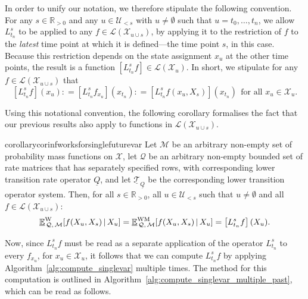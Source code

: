 \documentclass[10pt,a4paper]{paper}
\theoremstyle{definition}
\newcommand{\reals}{\mathbb{R}}
\newcommand{\realspos}{\reals_{>0}}
\newcommand{\states}{\mathcal{X}}
\newcommand{\gambles}{\mathcal{L}}
\newcommand{\rateset}{\mathcal{Q}}
\newcommand{\lrate}{\underline{Q}}
\newcommand{\coloneqq}{:\!=}
\begin{document}
In order to unify our notation, we therefore stipulate the following convention. For any $s\in\realspos$ and any $u\in\mathcal{U}_{<s}$ with $u\neq\emptyset$ such that $u=t_0,\ldots,t_n$, we allow $L_{t_n}^s$ to be applied to any $f\in\gambles(\states_{u\cup s})$, by applying it to the restriction of $f$ to the \emph{latest} time point at which it is defined---the time point $s$, in this case. Because this restriction depends on the state assignment $x_u$ at the other time points, the result is a function $[L_{t_n}^sf]\in\gambles(\states_u)$. In short, we stipulate for any $f\in\gambles(\states_{u\cup s})$ that
\begin{equation}\label{eq:applyLtolargerfunctions}
[L_{t_n}^sf](x_u) \coloneqq [L_{t_n}^sf_{x_u}](x_{t_n}) \coloneqq [L_{t_n}^sf(x_u,X_s)](x_{t_n})
~~\text{for all $x_u\in\states_u$}.
\end{equation}

Using this notational convention, the following corollary formalises the fact that our previous results also apply to functions in $\gambles(\states_{u\cup s})$.

\begin{restatable}{corollary}{corinfworksforsinglefuturevar}
\label{cor:inf_works_for_single_future_var}
Let $\mathcal{M}$ be an arbitrary non-empty set of probability mass functions on $\states$, let $\rateset$ be an arbitrary non-empty bounded set of rate matrices that has separately specified rows, with corresponding lower transition rate operator $\lrate$, and let $\underline{\mathcal{T}}_{\lrate}$ be the corresponding lower transition operator system. Then, for all $s\in\realspos$, all $u\in\mathcal{U}_{<s}$ such that $u\neq\emptyset$ and all $f\in\gambles(\states_{u\cup s})$:
\begin{equation*}
\underline{\mathbb{E}}^\mathrm{W}_{\,\rateset,\,\mathcal{M}}[f(X_u,X_s)\,\vert\,X_u]=\underline{\mathbb{E}}^{\mathrm{WM}}_{\,\rateset,\,\mathcal{M}}[f(X_u,X_s)\,\vert\,X_u]=\left[L_{t_n}^s f\right](X_u).\vspace{3pt}
\end{equation*}
\end{restatable}

Now, since $L_{t_n}^sf$ must be read as a separate application of the operator $L_{t_n}^s$ to every $f_{x_u}$, for $x_u\in\states_u$, it follows that we can compute $L_{t_n}^sf$ by applying Algorithm~\ref{alg:compute_singlevar} multiple times.
The method for this computation is outlined in Algorithm~\ref{alg:compute_singlevar_multiple_past}, which can be read as follows. 
\end{document}
